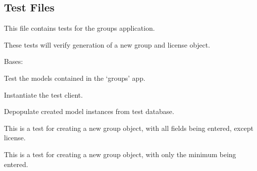 \documentclass[letterpaper,10pt,english]{sphinxmanual}
\begin{document}
\subsection{Test Files}
\label{api:id14}\label{api:module-groups.tests}
This file contains tests for the groups application.

These tests will verify generation of a new group and license object.


\begin{fulllineitems}
\label{api:groups.tests.GroupsModelTests}
Bases: 

Test the models contained in the `groups' app.


\begin{fulllineitems}
\label{api:groups.tests.GroupsModelTests.setUp}
Instantiate the test client.

\end{fulllineitems}



\begin{fulllineitems}
\label{api:groups.tests.GroupsModelTests.tearDown}
Depopulate created model instances from test database.

\end{fulllineitems}



\begin{fulllineitems}
\label{api:groups.tests.GroupsModelTests.test_create_group_all_fields}
This is a test for creating a new group object, with all fields being entered, except license.

\end{fulllineitems}



\begin{fulllineitems}
\label{api:groups.tests.GroupsModelTests.test_create_group_minimal}
This is a test for creating a new group object, with only the minimum being entered.


\end{fulllineitems}
\end{fulllineitems}
\end{document}
